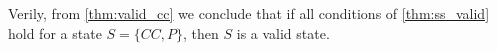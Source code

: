 Verily,  from \cref{thm:valid_cc} we conclude that if all conditions of \cref{thm:ss_valid} hold for a state $S=\{CC, P\}$,
then $S$ is a valid state. 




